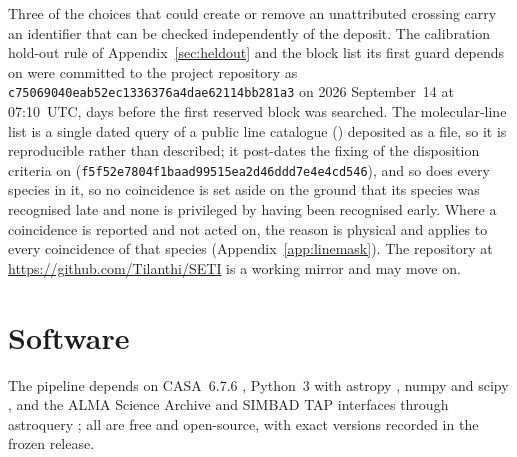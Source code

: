 Three of the choices that could create or remove an unattributed crossing
carry an identifier that can be checked independently of the deposit. The
calibration hold-out rule of Appendix~\ref{sec:heldout} and the block list
its first guard depends on were committed to the project repository as
\texttt{c75069040eab52ec1336376a4dae62114bb281a3} on 2026 September~14 at
07:10~UTC, \HoLeadBlockDays{} days before the first reserved block was
searched. The molecular-line list is a single dated query of a public line
catalogue (\McQueryDate) deposited as a file, so it is reproducible rather
than described; it post-dates the fixing of the disposition criteria on
\MkCritDate{} (\texttt{f5f52e7804f1baad99515ea2d46ddd7e4e4cd546}), and so
does every species in it, so no coincidence is set aside on the ground that
its species was recognised late and none is privileged by having been
recognised early. Where a coincidence is reported and not acted on, the
reason is physical and applies to every coincidence of that species
(Appendix~\ref{app:linemask}). The repository at
\url{https://github.com/Tilanthi/SETI} is a working mirror and may move on.

\section*{Software}
The pipeline depends on CASA~6.7.6 \citep[casatools/casatasks
6.7.6-14;][]{CASA2022}, Python~3 with astropy \citep{Astropy2022}, numpy
\citep{Harris2020} and scipy \citep{Virtanen2020}, and the ALMA Science
Archive and SIMBAD TAP interfaces through astroquery \citep{Ginsburg2019};
all are free and open-source, with exact
versions recorded in the frozen release.
